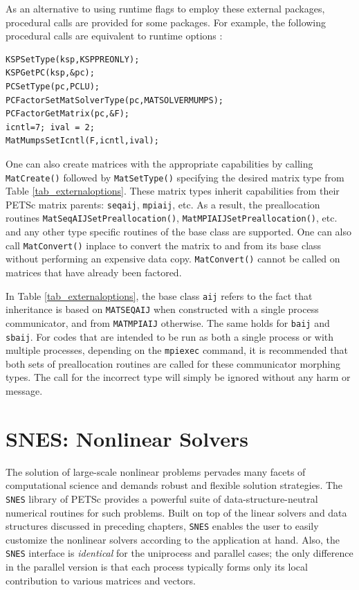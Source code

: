 As an alternative to using runtime flags to employ these external
packages,
procedural calls are provided for some packages. For example, the following procedural calls
are equivalent to runtime options
   :
\begin{lstlisting}
KSPSetType(ksp,KSPPREONLY);
KSPGetPC(ksp,&pc);
PCSetType(pc,PCLU);
PCFactorSetMatSolverType(pc,MATSOLVERMUMPS);
PCFactorGetMatrix(pc,&F);
icntl=7; ival = 2;
MatMumpsSetIcntl(F,icntl,ival);
\end{lstlisting}

One can also create matrices with the appropriate
capabilities by calling \lstinline{MatCreate()} followed by \lstinline{MatSetType()}
specifying the desired matrix type from Table \ref{tab_externaloptions}.
These matrix types inherit capabilities from their PETSc matrix
parents: \lstinline{seqaij}, \lstinline{mpiaij}, etc.  As a result, the preallocation routines
\lstinline{MatSeqAIJSetPreallocation()}, \lstinline{MatMPIAIJSetPreallocation()}, etc. and any other type
specific routines of the base class are supported.  One can also
call \lstinline{MatConvert()} inplace to convert the matrix to and from its base
class without performing an expensive data copy.  \lstinline{MatConvert()} cannot be
called on matrices that have already been factored.

In Table \ref{tab_externaloptions}, the base class \lstinline{aij} refers to the fact
that inheritance is based on \lstinline{MATSEQAIJ} when constructed with a single
process communicator, and from \lstinline{MATMPIAIJ} otherwise.  The same holds
for \lstinline{baij} and \lstinline{sbaij}.  For codes that are intended to be run as both a
single process or with multiple processes, depending on the \lstinline{mpiexec}
command, it is recommended that both sets of preallocation routines
are called for these communicator morphing types.  The call for the
incorrect type will simply be ignored without any harm or message.

\cleardoublepage
\chapter{SNES: Nonlinear Solvers}
\label{chapter_snes}

The solution of large-scale nonlinear problems pervades many facets of
computational science and demands robust and flexible solution
strategies. The \lstinline{SNES} library of PETSc provides a powerful suite of
data-structure-neutral numerical routines for such problems.  Built on
top of the linear solvers and data structures discussed in preceding
chapters, \lstinline{SNES} enables the user to easily customize the nonlinear
solvers according to the application at hand.  Also, the \lstinline{SNES}
interface is {\em identical} for the uniprocess and parallel cases;
the only difference in the parallel version is that each process
typically forms only its local contribution to various matrices and
vectors.

